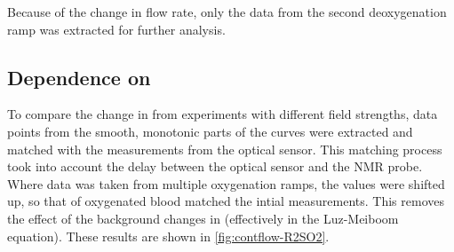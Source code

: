 Because of the change in flow rate, only the data from the second deoxygenation ramp was extracted for further analysis.

\subsection{Dependence on \SOtwo}
\label{contflow:fieldcomp}
To compare the change in \Ttwo from experiments with different field strengths, data points from the smooth, monotonic parts of the \Ttwo curves were extracted and matched with the \SOtwo measurements from the optical sensor.
This matching process took into account the delay between the optical sensor and the NMR probe.
Where data was taken from multiple oxygenation ramps, the \Ttwo values were shifted up, so that \Ttwo of oxygenated blood matched the intial measurements.
This removes the effect of the background changes in \Ttwo (effectively \TtwoO in the Luz-Meiboom equation).
These results are shown in \autoref{fig:contflow-R2SO2}.

